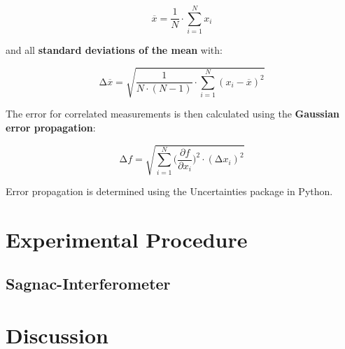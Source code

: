 \begin{equation}
    \overline{x} = \frac{1}{N} \cdot \sum_{i=1}^N x_i
    \label{eqn:Mittelwert}
\end{equation}

and all \textbf{standard deviations of the mean} with:

\begin{equation}
    \increment\overline{x} = \sqrt{\frac{1}{N\cdot(N-1)}\cdot\sum_{i=1}^N (x_i-\overline{x})^2}
    \label{eqn:St_Mittelwert}
\end{equation}

The error for correlated measurements is then calculated using the \textbf{Gaussian error propagation}:

\begin{equation}
    \increment{f} = \sqrt{ \sum_{i = 1}^{N}  \biggl(\frac{\partial{f}}{\partial{x_i}}\biggr)^2\cdot(\increment{x_i})^2}
    \label{eqn:Gauss}
\end{equation}

Error propagation is determined using the Uncertainties \cite{uncertainties} package in Python.


\section{Experimental Procedure}

\subsection{Sagnac-Interferometer}






\section{Discussion}


\newpage
\printbibliography

